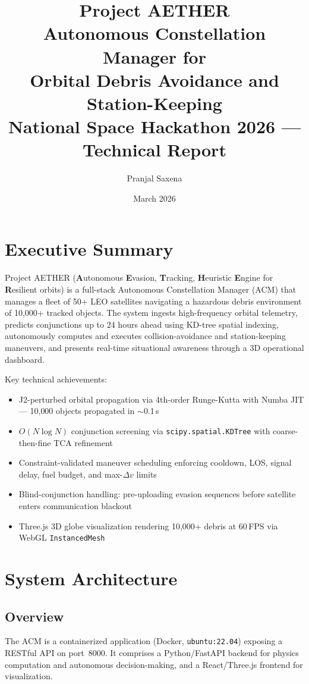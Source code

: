 \documentclass[11pt, a4paper]{article}
\title{
  \vspace{-1cm}
  \textbf{Project AETHER} \\[4pt]
  \large Autonomous Constellation Manager for \\
  Orbital Debris Avoidance and Station-Keeping \\[8pt]
  \normalsize National Space Hackathon 2026 — Technical Report
}
\author{
  Pranjal Saxena
}
\date{March 2026}
\begin{document}
\maketitle
\tableofcontents
\newpage

\section{Executive Summary}

Project AETHER (\textbf{A}utonomous \textbf{E}vasion, \textbf{T}racking, \textbf{H}euristic \textbf{E}ngine for \textbf{R}esilient orbits) is a full-stack Autonomous Constellation Manager (ACM) that manages a fleet of 50+ LEO satellites navigating a hazardous debris environment of 10{,}000+ tracked objects. The system ingests high-frequency orbital telemetry, predicts conjunctions up to 24 hours ahead using KD-tree spatial indexing, autonomously computes and executes collision-avoidance and station-keeping maneuvers, and presents real-time situational awareness through a 3D operational dashboard.

Key technical achievements:
\begin{itemize}[nosep]
  \item J2-perturbed orbital propagation via 4th-order Runge-Kutta with Numba JIT — 10{,}000 objects propagated in $\sim$0.1\,s
  \item $O(N \log N)$ conjunction screening via \texttt{scipy.spatial.KDTree} with coarse-then-fine TCA refinement
  \item Constraint-validated maneuver scheduling enforcing cooldown, LOS, signal delay, fuel budget, and max-$\Delta v$ limits
  \item Blind-conjunction handling: pre-uploading evasion sequences before satellite enters communication blackout
  \item Three.js 3D globe visualization rendering 10{,}000+ debris at 60\,FPS via WebGL \texttt{InstancedMesh}
\end{itemize}

\section{System Architecture}

\subsection{Overview}
The ACM is a containerized application (Docker, \texttt{ubuntu:22.04}) exposing a RESTful API on port~8000. It comprises a Python/FastAPI backend for physics computation and autonomous decision-making, and a React/Three.js frontend for visualization.
\end{document}

